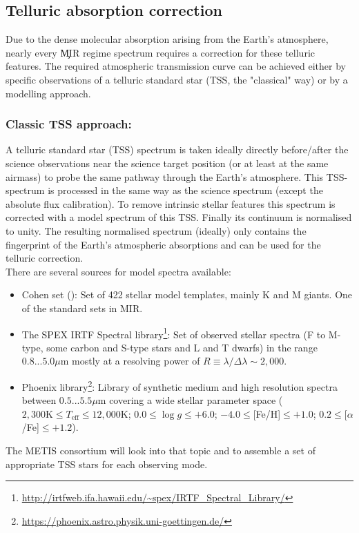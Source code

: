 
\subsection{Telluric absorption correction}\label{ssec:tellcorr}
Due to the dense molecular absorption arising from the Earth's atmosphere, nearly every \c{MIR} regime spectrum requires a correction for these telluric features. The required atmospheric transmission curve can be achieved either by specific observations of a telluric standard star (\ac{TSS}, the "classical" way) or by a modelling approach. \\
\subsubsection{Classic \ac{TSS} approach:}
A telluric standard star (\ac{TSS}) spectrum is taken ideally directly before/after the science observations near the science target position (or at least at the same airmass) to probe the same pathway through the Earth's atmosphere. This \ac{TSS}-spectrum is processed in the same way as the science spectrum (except the absolute flux calibration). To remove intrinsic stellar features this spectrum is corrected with a model spectrum of this \ac{TSS}. Finally its continuum is normalised to unity. The resulting normalised spectrum (ideally) only contains the fingerprint of the Earth's atmospheric absorptions and can be used for the telluric correction.\\
There are several sources for model spectra available:
\begin{itemize}
    \item Cohen set (\cite{coh99}): Set of 422 stellar model templates, mainly K and M giants. One of the standard sets in \ac{MIR}.
    \item The SPEX \ac{IRTF} Spectral library\footnote{\url{http://irtfweb.ifa.hawaii.edu/~spex/IRTF_Spectral_Library/}}: Set of observed stellar spectra (F to M-type, some carbon and S-type stars and L and T dwarfs) in the range $0.8...5.0\mu$m mostly at a resolving power of $R\equiv\lambda/\Delta\lambda\sim2,000$.
    \item Phoenix library\footnote{\url{https://phoenix.astro.physik.uni-goettingen.de/}}\cite{phoenix}: Library of synthetic medium and high resolution spectra between $0.5...5.5\mu$m covering a wide stellar parameter space ($2,300\textrm{K}\leq T_\textrm{eff}\leq12,000\textrm{K}$; $0.0\leq\log g\leq+6.0$; $-4.0\leq$[Fe/H]$\leq+1.0$; $0.2\leq$[$\alpha$/Fe]$\leq+1.2$). \\
\end{itemize}
The \ac{METIS} consortium will look into that topic and to assemble a set of appropriate \ac{TSS} stars for each observing mode.
